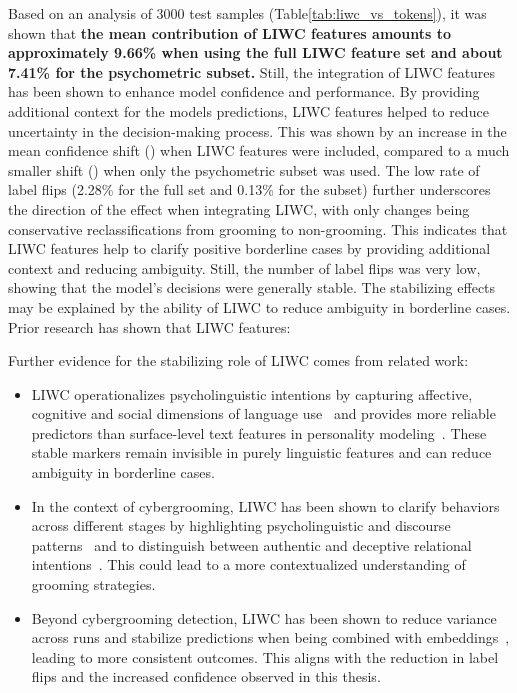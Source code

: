 Based on an analysis of 3000 test samples (Table\ref{tab:liwc_vs_tokens}), it was shown that \textbf{the mean contribution of LIWC features amounts to approximately 9.66\% when using the full LIWC feature set and about 7.41\% for the psychometric subset.} Still, the integration of LIWC features has  been shown to enhance model confidence and performance. By providing additional context for the models predictions, LIWC features helped to reduce uncertainty in the decision-making process. This was shown by an increase in the mean confidence shift (\Delta \mu {}) when LIWC features were included, compared to a much smaller shift (\Delta \mu {}) when only the psychometric subset was used. The low rate of label flips (2.28\% for the full set and 0.13\% for the subset) further underscores the direction of the effect when integrating LIWC, with only changes being conservative reclassifications from grooming to non-grooming. This indicates that LIWC features help to clarify positive borderline cases by providing additional context and reducing ambiguity. Still, the number of label flips was very low, showing that the model's decisions were generally stable. The stabilizing effects may be explained by the ability of LIWC to reduce ambiguity in borderline cases. Prior research has shown that LIWC features:

Further evidence for the stabilizing role of LIWC comes from related work:

\begin{itemize}
    \item LIWC operationalizes psycholinguistic intentions by capturing affective, cognitive and social dimensions of language use~\cite{pennebaker2022liwc} and provides more reliable predictors than surface-level text features in personality modeling~\cite{farnadi2018user}. These stable markers remain invisible in purely linguistic features and can reduce ambiguity in borderline cases.
    \item In the context of cybergrooming, LIWC has been shown to clarify behaviors across different stages by highlighting psycholinguistic and discourse patterns~\cite{Cano2014} and to distinguish between authentic and deceptive relational intentions~\cite{broome2020psycholinguistic}. This could lead to a more contextualized understanding of grooming strategies.
    \item Beyond cybergrooming detection, LIWC has been shown to reduce variance across runs and stabilize predictions when being combined with embeddings~\cite{mehta2020bottomup}, leading to more consistent outcomes. This aligns with the reduction in label flips and the increased confidence observed in this thesis.
\end{itemize}

